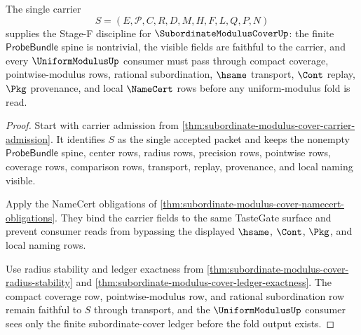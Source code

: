 \begin{theorem}
\label{thm:subordinate-modulus-cover-tastegate-stagef}
The single carrier
$$
S=(E,\mathcal{P},C,R,D,M,H,F,L,Q,P,N)
$$
supplies the Stage-F discipline for $\SubordinateModulusCoverUp$: the finite $\mathsf{ProbeBundle}$ spine is nontrivial, the visible fields are faithful to the carrier, and every $\UniformModulusUp$ consumer must pass through compact coverage, pointwise-modulus rows, rational subordination, $\hsame$ transport, $\Cont$ replay, $\Pkg$ provenance, and local $\NameCert$ rows before any uniform-modulus fold is read.
\end{theorem}
\begin{proof}
Start with carrier admission from \autoref{thm:subordinate-modulus-cover-carrier-admission}. It identifies $S$ as the single accepted packet and keeps the nonempty $\mathsf{ProbeBundle}$ spine, center rows, radius rows, precision rows, pointwise rows, coverage rows, comparison rows, transport, replay, provenance, and local naming visible.

Apply the NameCert obligations of \autoref{thm:subordinate-modulus-cover-namecert-obligations}. They bind the carrier fields to the same TasteGate surface and prevent consumer reads from bypassing the displayed $\hsame$, $\Cont$, $\Pkg$, and local naming rows.

Use radius stability and ledger exactness from \autoref{thm:subordinate-modulus-cover-radius-stability} and \autoref{thm:subordinate-modulus-cover-ledger-exactness}. The compact coverage row, pointwise-modulus row, and rational subordination row remain faithful to $S$ through transport, and the $\UniformModulusUp$ consumer sees only the finite subordinate-cover ledger before the fold output exists.
\end{proof}

